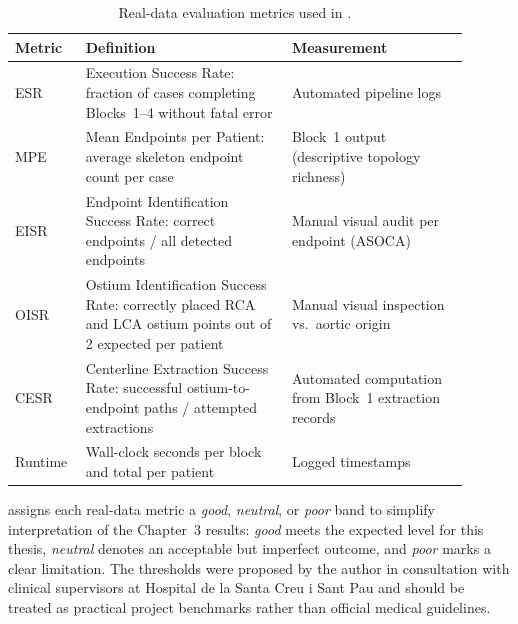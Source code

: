 \begin{table}[H]
  \caption{Real-data evaluation metrics used in .}
  \label{tab:validation-real-metrics}
  \vspace{0.5em}
  \centering
  \small
  \renewcommand{\arraystretch}{1.35}
  \setlength{\tabcolsep}{6pt}
  \begin{tabular}{@{}>{\raggedright\arraybackslash}p{0.12\linewidth}>{\raggedright\arraybackslash}p{0.42\linewidth}>{\raggedright\arraybackslash}p{0.36\linewidth}@{}}
    \toprule
    \cellcolor{gray!12}\textbf{Metric} &
    \cellcolor{gray!12}\textbf{Definition} &
    \cellcolor{gray!12}\textbf{Measurement} \\
    \midrule
    ESR & Execution Success Rate: fraction of cases completing Blocks~1--4 without fatal error & Automated pipeline logs \\
    MPE & Mean Endpoints per Patient: average skeleton endpoint count per case & Block~1 output (descriptive topology richness) \\
    EISR & Endpoint Identification Success Rate: correct endpoints / all detected endpoints & Manual visual audit per endpoint (ASOCA) \\
    OISR & Ostium Identification Success Rate: correctly placed RCA and LCA ostium points out of 2 expected per patient & Manual visual inspection vs.\ aortic origin \\
    CESR & Centerline Extraction Success Rate: successful ostium-to-endpoint paths / attempted extractions & Automated computation from Block~1 extraction records \\
    Runtime & Wall-clock seconds per block and total per patient & Logged timestamps \\
    \bottomrule
  \end{tabular}
\end{table}

 assigns each real-data metric a \emph{good}, \emph{neutral}, or \emph{poor} band to simplify interpretation of the Chapter~3 results: \emph{good} meets the expected level for this thesis, \emph{neutral} denotes an acceptable but imperfect outcome, and \emph{poor} marks a clear limitation. The thresholds were proposed by the author in consultation with clinical supervisors at Hospital de la Santa Creu i Sant Pau and should be treated as practical project benchmarks rather than official medical guidelines.


